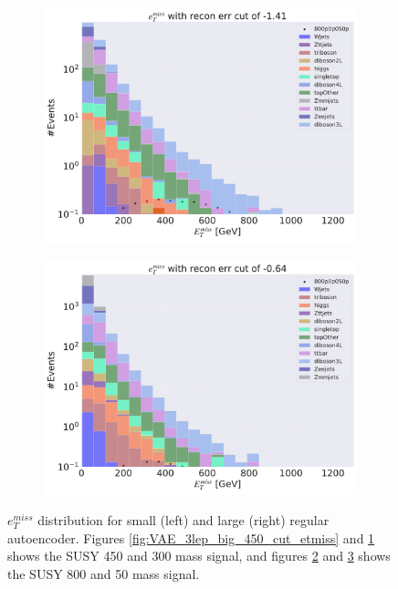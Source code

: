 \begin{figure}[H]
\begin{subfigure}{.45\textwidth}
        \caption{}
        \label{fig:VAE_3lep_small_450_cut_etmiss}
    \end{subfigure}
    \hfill
    \begin{subfigure}{.45\textwidth}
        \includegraphics[width=\textwidth]{Figures/VAE_testing/big/3lep/b_data_recon_big_rm3_feats_sig_800p0p050p_etmiss_recon_errcut_-0.52.pdf}
        \caption{}
        \label{fig:VAE_3lep_big_800_cut_etmiss}
    \end{subfigure}
    \hfill   
    \begin{subfigure}{.45\textwidth}
        \includegraphics[width=\textwidth]{Figures/VAE_testing/small/3lep/b_data_recon_big_rm3_feats_sig_800p0p050p_etmiss_recon_errcut_-0.64.pdf}
        \caption{}
        \label{fig:VAE_3lep_small_800_cut_etmiss}
    \end{subfigure}
    \hfill      
    \caption[Some $e_T^{miss}$ cuts for VAE]{$e_T^{miss}$ distribution for small (left) and large (right) regular autoencoder.
    Figures \ref{fig:VAE_3lep_big_450_cut_etmiss} and \ref{fig:VAE_3lep_small_450_cut_etmiss} shows the SUSY 450 and 300 mass signal, 
    and figures \ref{fig:VAE_3lep_big_800_cut_etmiss} and \ref{fig:VAE_3lep_small_800_cut_etmiss} shows the SUSY 800 and 50 mass signal.}
    \label{fig:VAE_3lep_recon_err_both_sig_cut_etmiss}
\end{figure}

